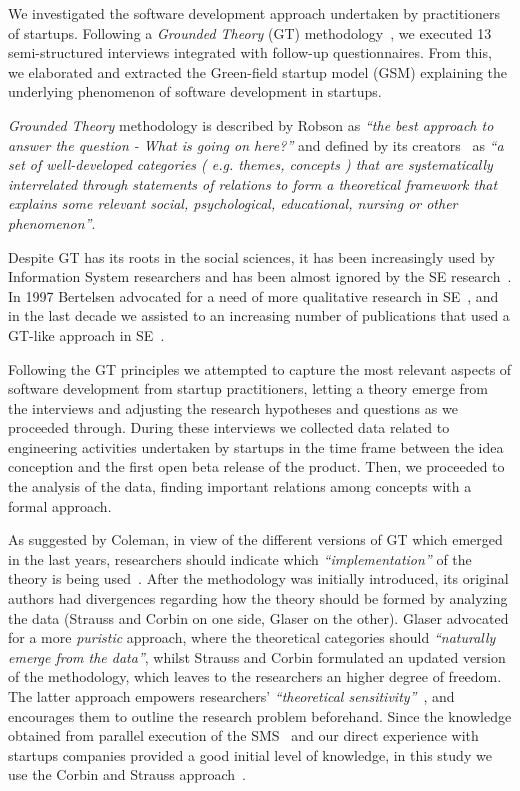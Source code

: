 \documentclass[10pt,journal,letterpaper,compsoc]{IEEEtran}
\begin{document}
We investigated the software development approach undertaken by practitioners
of startups. Following a \textit{Grounded Theory} (GT) 
methodology~\cite{Glaser1978}, we executed 13 semi-structured interviews 
integrated with follow-up questionnaires. From this, we elaborated and 
extracted the Green-field startup model (GSM) explaining the underlying 
phenomenon of software development in startups.

\textit{Grounded Theory} methodology is described by Robson as \textit{``the
best approach to answer the question - What is going on here?''} and defined by
its creators~\cite{ColinRobson2009} as \textit{``a set of well-developed
categories ( e.g. themes, concepts ) that are systematically interrelated
through statements of relations to form a theoretical framework that explains
some relevant social, psychological, educational, nursing or other
phenomenon''}.

Despite GT has its roots in the social sciences, it has been increasingly used
by Information System researchers and has been almost ignored by the SE 
research~\cite{Coleman2007}. In 1997 Bertelsen advocated for a need of more 
qualitative research in SE~\cite{Bertelsen1997}, and in the last decade we 
assisted to an increasing number of publications that used a GT-like approach 
in SE~\cite{Coleman2008a,Coleman2007, Sulayman2012}.

Following the GT principles we attempted to capture the most relevant aspects
of software development from startup practitioners, letting a theory emerge
from the interviews and adjusting the research hypotheses and questions as we
proceeded through. During these interviews we collected data related to
engineering activities undertaken by startups in the time frame between the idea
conception and the first open beta release of the product. Then, we proceeded
to the analysis of the data, finding important relations among concepts with a
formal approach.

As suggested by Coleman, in view of the different versions of GT which emerged
in the last years, researchers should indicate which \textit{``implementation''}
of the theory is being used~\cite{Coleman2007}. After the methodology was
initially introduced, its original authors had divergences regarding how the
theory should be formed by analyzing the data (Strauss and Corbin on one side,
Glaser on the other). Glaser advocated for a more \textit{puristic} approach,
where the theoretical categories should \textit{``naturally emerge from the
data''}, whilst Strauss and Corbin formulated an updated version of the
methodology, which leaves to the researchers an higher degree of freedom. The
latter approach empowers researchers' \textit{``theoretical 
sensitivity''}~\cite{Corbin1990}, and encourages them to outline the research 
problem beforehand. Since the knowledge obtained from parallel execution of the 
SMS~\cite{SMS} and our direct experience with startups companies provided a good
initial level of knowledge, in this study we use the Corbin and Strauss
approach~\cite{Strauss1998}.
\end{document}
